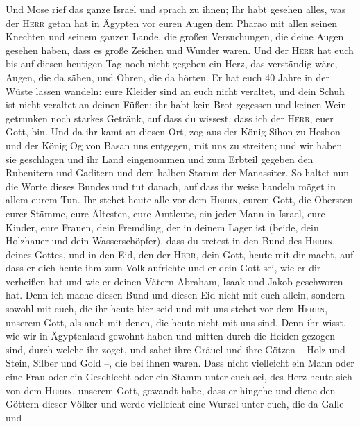  Und Mose rief das ganze Israel und sprach zu ihnen; Ihr
habt gesehen alles, was der \textsc{Herr} getan hat in Ägypten vor euren
Augen dem Pharao mit allen seinen Knechten und seinem ganzen Lande,
 die großen Versuchungen, die deine Augen gesehen haben,
dass es große Zeichen und Wunder waren.  Und der
\textsc{Herr} hat euch bis auf diesen heutigen Tag noch nicht gegeben
ein Herz, das verständig wäre, Augen, die da sähen, und Ohren, die da
hörten.  Er hat euch 40 Jahre in der Wüste lassen wandeln:
eure Kleider sind an euch nicht veraltet, und dein Schuh ist nicht
veraltet an deinen Füßen;  ihr habt kein Brot gegessen und
keinen Wein getrunken noch starkes Getränk, auf dass du wissest, dass
ich der \textsc{Herr}, euer Gott, bin.  Und da ihr kamt an
diesen Ort, zog aus der König Sihon zu Hesbon und der König Og von Basan
uns entgegen, mit uns zu streiten; und wir haben sie geschlagen
 und ihr Land eingenommen und zum Erbteil gegeben den
Rubenitern und Gaditern und dem halben Stamm der Manassiter.
 So haltet nun die Worte dieses Bundes und tut danach, auf
dass ihr weise handeln möget in allem eurem Tun.  Ihr
stehet heute alle vor dem \textsc{Herrn}, eurem Gott, die Obersten eurer
Stämme, eure Ältesten, eure Amtleute, ein jeder Mann in Israel,
 eure Kinder, eure Frauen, dein Fremdling, der in deinem
Lager ist (beide, dein Holzhauer und dein Wasserschöpfer),
 dass du tretest in den Bund des \textsc{Herrn}, deines
Gottes, und in den Eid, den der \textsc{Herr}, dein Gott, heute mit dir
macht,  auf dass er dich heute ihm zum Volk aufrichte und
er dein Gott sei, wie er dir verheißen hat und wie er deinen Vätern
Abraham, Isaak und Jakob geschworen hat.  Denn ich mache
diesen Bund und diesen Eid nicht mit euch allein, 
sondern sowohl mit euch, die ihr heute hier seid und mit uns stehet vor
dem \textsc{Herrn}, unserem Gott, als auch mit denen, die heute nicht
mit uns sind.  Denn ihr wisst, wie wir in Ägyptenland
gewohnt haben und mitten durch die Heiden gezogen sind, durch welche ihr
zoget,  und sahet ihre Gräuel und ihre Götzen -- Holz und
Stein, Silber und Gold --, die bei ihnen waren.  Dass
nicht vielleicht ein Mann oder eine Frau oder ein Geschlecht oder ein
Stamm unter euch sei, des Herz heute sich von dem \textsc{Herrn},
unserem Gott, gewandt habe, dass er hingehe und diene den Göttern dieser
Völker und werde vielleicht eine Wurzel unter euch, die da Galle und
